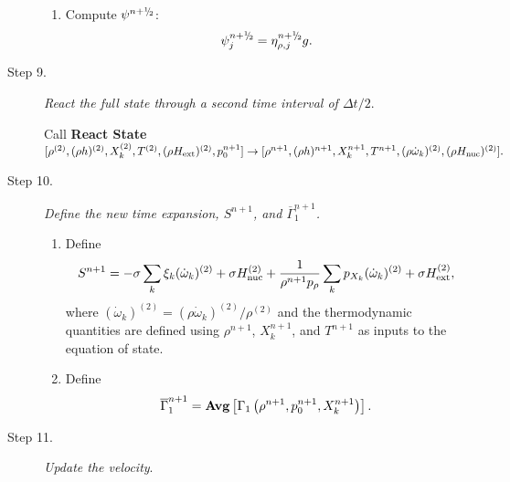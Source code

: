 \documentclass{aastex62}
\newcommand{\sfrac}[2]{\mathchoice
  {\kern0em\raise.5ex\hbox{\the\scriptfont0 #1}\kern-.15em/
   \kern-.15em\lower.25ex\hbox{\the\scriptfont0 #2}}
  {\kern0em\raise.5ex\hbox{\the\scriptfont0 #1}\kern-.15em/
   \kern-.15em\lower.25ex\hbox{\the\scriptfont0 #2}}
  {\kern0em\raise.5ex\hbox{\the\scriptscriptfont0 #1}\kern-.2em/
   \kern-.15em\lower.25ex\hbox{\the\scriptscriptfont0 #2}}
  {#1\!/#2}}
\newcommand{\myhalf}{\sfrac{1}{2}}
\newcommand{\dt}{\Delta t}
\newcommand{\Hext}{H_{\rm ext}}
\newcommand{\Hnuc}{H_{\rm nuc}}
\newcommand{\omegadot}{\dot\omega}
\newcommand{\nph}{{n+\myhalf}}
\begin{document}
\begin{description}
\begin{enumerate}
\item Compute $\psi^{\nph}$: 
\begin{equation}
\psi_j^{\nph} = \eta_{\rho,j}^{\nph} g.
\end{equation}

\end{enumerate}

\item[Step 9.] {\em React the full state through a second time interval of $\dt / 2.$}

Call {\bf React State}$[\rho^{(2)},(\rho h)^{(2)}, X_k^{(2)},T^{(2)}, (\rho\Hext)^{(2)}, p_0^{n+1}] \rightarrow [\rho^{n+1}, (\rho h)^{n+1}, X_k^{n+1}, T^{n+1}, (\rho \omegadot_k)^{(2)}, (\rho \Hnuc)^{(2)} ].$

\item[Step 10.] {\em Define the new time expansion, $S^{n+1}$, and $\overline{\Gamma}_1^{n+1}$.}

\begin{enumerate}
\renewcommand{\theenumi}{{\bf \Alph{enumi}}}
\item Define
\begin{equation}
  S^{n+1} =  -\sigma  \sum_k  \xi_k (\omegadot_k)^{(2)}  + \sigma \Hnuc^{(2)} +
  \frac{1}{\rho^{n+1} p_\rho} \sum_k p_{X_k}  ({\omegadot}_k)^{(2)}
   + \sigma \Hext^{(2)},
\end{equation}
where $(\omegadot_k)^{(2)} = (\rho \omegadot_k)^{(2)} / \rho^{(2)}$
and the thermodynamic quantities are defined using $\rho^{n+1}$,
$X_k^{n+1}$, and $T^{n+1}$ as inputs to the equation of state.

\item Define
\begin{equation}
\overline{\Gamma}_1^{n+1} = {\rm{\bf Avg}}\left[\Gamma_1\left(\rho^{n+1}, p_0^{n+1},
X_k^{n+1}\right) \right].
\end{equation}

\end{enumerate}


\item[Step 11.] {\em Update the velocity}.


\end{description}
\end{document}
